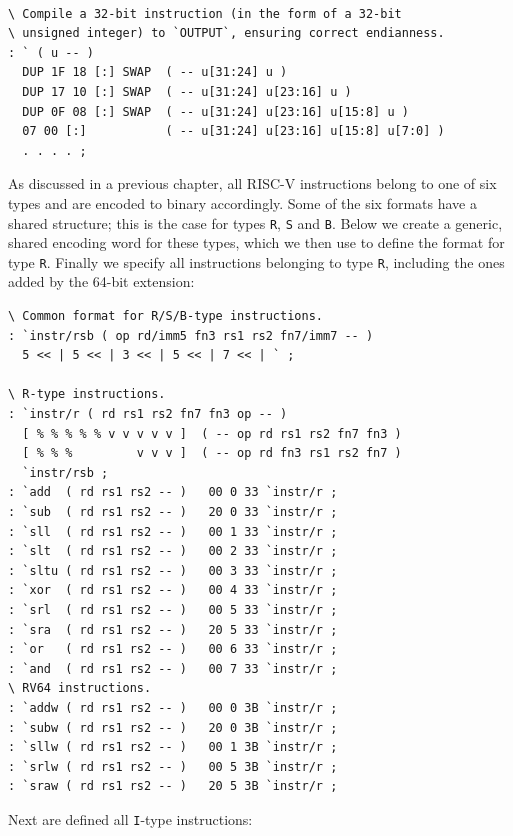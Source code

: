 \documentclass[a4paper,12pt,final]{article}
\begin{document}
\fontsize{9pt}{9.000000pt}\selectfont
\begin{verbatim}

\ Compile a 32-bit instruction (in the form of a 32-bit
\ unsigned integer) to `OUTPUT`, ensuring correct endianness.
: ` ( u -- )
  DUP 1F 18 [:] SWAP  ( -- u[31:24] u )
  DUP 17 10 [:] SWAP  ( -- u[31:24] u[23:16] u )
  DUP 0F 08 [:] SWAP  ( -- u[31:24] u[23:16] u[15:8] u )
  07 00 [:]           ( -- u[31:24] u[23:16] u[15:8] u[7:0] )
  . . . . ;
\end{verbatim}
\normalsize

As discussed in a previous chapter, all RISC-V instructions belong to
one of six types and are encoded to binary accordingly.  Some of the
six formats have a shared structure; this is the case for types \texttt{R},
\texttt{S} and \texttt{B}.  Below we create a generic, shared encoding word for
these types, which we then use to define the format for type \texttt{R}.
Finally we specify all instructions belonging to type \texttt{R}, including
the ones added by the 64-bit extension:

\fontsize{9pt}{9.000000pt}\selectfont
\begin{verbatim}
\ Common format for R/S/B-type instructions.
: `instr/rsb ( op rd/imm5 fn3 rs1 rs2 fn7/imm7 -- )
  5 << | 5 << | 3 << | 5 << | 7 << | ` ;

\ R-type instructions.
: `instr/r ( rd rs1 rs2 fn7 fn3 op -- )
  [ % % % % % v v v v v ]  ( -- op rd rs1 rs2 fn7 fn3 )
  [ % % %         v v v ]  ( -- op rd fn3 rs1 rs2 fn7 )
  `instr/rsb ;
: `add  ( rd rs1 rs2 -- )   00 0 33 `instr/r ;
: `sub  ( rd rs1 rs2 -- )   20 0 33 `instr/r ;
: `sll  ( rd rs1 rs2 -- )   00 1 33 `instr/r ;
: `slt  ( rd rs1 rs2 -- )   00 2 33 `instr/r ;
: `sltu ( rd rs1 rs2 -- )   00 3 33 `instr/r ;
: `xor  ( rd rs1 rs2 -- )   00 4 33 `instr/r ;
: `srl  ( rd rs1 rs2 -- )   00 5 33 `instr/r ;
: `sra  ( rd rs1 rs2 -- )   20 5 33 `instr/r ;
: `or   ( rd rs1 rs2 -- )   00 6 33 `instr/r ;
: `and  ( rd rs1 rs2 -- )   00 7 33 `instr/r ;
\ RV64 instructions.
: `addw ( rd rs1 rs2 -- )   00 0 3B `instr/r ;
: `subw ( rd rs1 rs2 -- )   20 0 3B `instr/r ;
: `sllw ( rd rs1 rs2 -- )   00 1 3B `instr/r ;
: `srlw ( rd rs1 rs2 -- )   00 5 3B `instr/r ;
: `sraw ( rd rs1 rs2 -- )   20 5 3B `instr/r ;
\end{verbatim}
\normalsize

Next are defined all \texttt{I}-type instructions:
\end{document}
